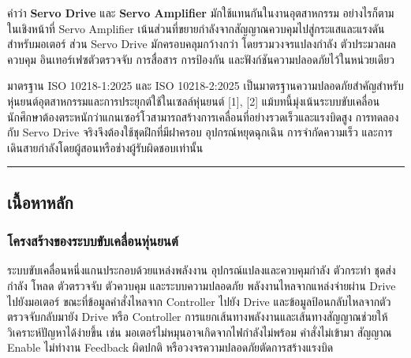 คำว่า \textbf{Servo Drive} และ \textbf{Servo Amplifier} มักใช้แทนกันในงานอุตสาหกรรม อย่างไรก็ตาม ในเชิงหน้าที่ Servo Amplifier เน้นส่วนที่ขยายกำลังจากสัญญาณควบคุมไปสู่กระแสและแรงดันสำหรับมอเตอร์ ส่วน Servo Drive มักครอบคลุมกว้างกว่า โดยรวมวงจรแปลงกำลัง ตัวประมวลผลควบคุม อินเทอร์เฟซตัวตรวจจับ การสื่อสาร การป้องกัน และฟังก์ชันความปลอดภัยไว้ในหน่วยเดียว

มาตรฐาน ISO 10218-1:2025 และ ISO 10218-2:2025 เป็นมาตรฐานความปลอดภัยสำคัญสำหรับหุ่นยนต์อุตสาหกรรมและการประยุกต์ใช้ในเซลล์หุ่นยนต์ [1], [2] แม้บทนี้มุ่งเน้นระบบขับเคลื่อน นักศึกษาต้องตระหนักว่าแกนเซอร์โวสามารถสร้างการเคลื่อนที่อย่างรวดเร็วและแรงบิดสูง การทดลองกับ Servo Drive จริงจึงต้องใช้ชุดฝึกที่มีฝาครอบ อุปกรณ์หยุดฉุกเฉิน การจำกัดความเร็ว และการเดินสายกำลังโดยผู้สอนหรือช่างผู้รับผิดชอบเท่านั้น

\par\noindent\rule{\textwidth}{0.4pt}\par

\subsection{เนื้อหาหลัก}

\subsubsection{โครงสร้างของระบบขับเคลื่อนหุ่นยนต์}

ระบบขับเคลื่อนหนึ่งแกนประกอบด้วยแหล่งพลังงาน อุปกรณ์แปลงและควบคุมกำลัง ตัวกระทำ ชุดส่งกำลัง โหลด ตัวตรวจจับ ตัวควบคุม และระบบความปลอดภัย พลังงานไหลจากแหล่งจ่ายผ่าน Drive ไปยังมอเตอร์ ขณะที่ข้อมูลคำสั่งไหลจาก Controller ไปยัง Drive และข้อมูลป้อนกลับไหลจากตัวตรวจจับกลับมายัง Drive หรือ Controller การแยกเส้นทางพลังงานและเส้นทางสัญญาณช่วยให้วิเคราะห์ปัญหาได้ง่ายขึ้น เช่น มอเตอร์ไม่หมุนอาจเกิดจากไฟกำลังไม่พร้อม คำสั่งไม่เข้ามา สัญญาณ Enable ไม่ทำงาน Feedback ผิดปกติ หรือวงจรความปลอดภัยตัดการสร้างแรงบิด



